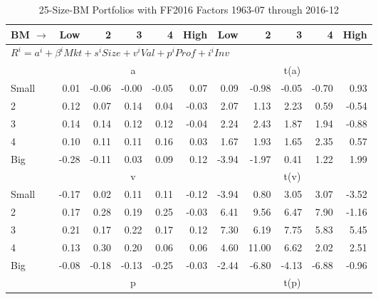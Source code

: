 
\begin{table}[!ht]
\centering
\caption{25-Size-BM Portfolios with FF2016 Factors 1963-07 through 2016-12}
\begin{tabular}{lrrrrrrrrrr}
  \toprule
    BM $\rightarrow$ & Low & 2 & 3 & 4 & High & Low & 2 & 3 & 4 & High \\ 
  \midrule
  \multicolumn{11}{l}{$R^i=a^i+\beta^iMkt+s^iSize+v^iVal+p^iProf+i^iInv$} \\

  
    
      & \multicolumn{5}{c}{a} & \multicolumn{5}{c}{t(a)}
    
    \\
      \cmidrule(r){2-6} \cmidrule(r){7-11}

    Small   & 0.01  & -0.06  & -0.00  & -0.05  & 0.07  & 0.09  & -0.98  & -0.05  & -0.70  & 0.93  \\
         2  & 0.12  & 0.07  & 0.14  & 0.04  & -0.03  & 2.07  & 1.13  & 2.23  & 0.59  & -0.54  \\
         3  & 0.14  & 0.14  & 0.12  & 0.12  & -0.04  & 2.24  & 2.43  & 1.87  & 1.94  & -0.88  \\
         4  & 0.10  & 0.11  & 0.11  & 0.16  & 0.03  & 1.67  & 1.93  & 1.65  & 2.35  & 0.57  \\
    Big     & -0.28  & -0.11  & 0.03  & 0.09  & 0.12  & -3.94  & -1.97  & 0.41  & 1.22  & 1.99  \\

  
    
      & \multicolumn{5}{c}{v} & \multicolumn{5}{c}{t(v)}
    
    \\
      \cmidrule(r){2-6} \cmidrule(r){7-11}

    Small   & -0.17  & 0.02  & 0.11  & 0.11  & -0.12  & -3.94  & 0.80  & 3.05  & 3.07  & -3.52  \\
         2  & 0.17  & 0.28  & 0.19  & 0.25  & -0.03  & 6.41  & 9.56  & 6.47  & 7.90  & -1.16  \\
         3  & 0.21  & 0.17  & 0.22  & 0.17  & 0.12  & 7.30  & 6.19  & 7.75  & 5.83  & 5.45  \\
         4  & 0.13  & 0.30  & 0.20  & 0.06  & 0.06  & 4.60  & 11.00  & 6.62  & 2.02  & 2.51  \\
    Big     & -0.08  & -0.18  & -0.13  & -0.25  & -0.03  & -2.44  & -6.80  & -4.13  & -6.88  & -0.96  \\

  
    
      & \multicolumn{5}{c}{p} & \multicolumn{5}{c}{t(p)}
    

\end{tabular}
\end{table}
